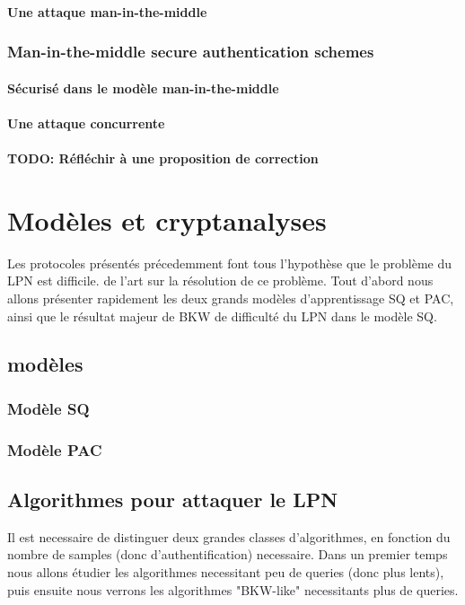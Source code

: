 \documentclass{article}		%
\begin{document}
\paragraph{Une attaque man-in-the-middle}
\subsubsection{Man-in-the-middle secure authentication schemes}
\paragraph{Sécurisé dans le modèle man-in-the-middle}
\paragraph{Une attaque concurrente}
\paragraph{TODO: Réfléchir à une proposition de correction}
\section{Modèles et cryptanalyses}
Les protocoles présentés précedemment font tous l'hypothèse que le
problème du LPN est difficile. 
de l'art sur la résolution de ce problème. Tout d'abord nous allons
présenter rapidement les deux grands modèles d'apprentissage SQ et PAC, ainsi que le
résultat majeur de BKW de difficulté du LPN dans le modèle SQ. 

\subsection{modèles}
\subsubsection{Modèle SQ}

\subsubsection{Modèle PAC}

\subsection{Algorithmes pour attaquer le LPN}
Il est necessaire de distinguer deux grandes classes
d'algorithmes, en fonction du nombre de samples (donc d'authentification)
necessaire. Dans un premier temps nous allons étudier les algorithmes
necessitant peu de queries (donc plus lents), puis ensuite nous verrons
les algorithmes "BKW-like" necessitants plus de queries.
\end{document}
